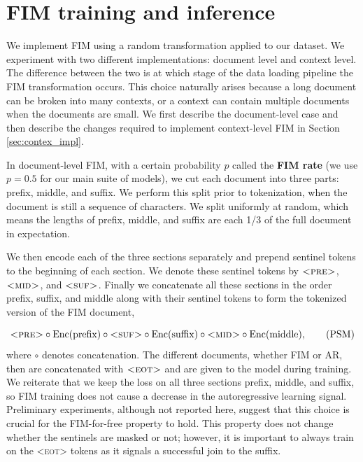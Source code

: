 \documentclass[postscript]{article}
\begin{document}
\section{FIM training and inference}
\label{sec:fim_training}

We implement FIM using a random transformation applied to our dataset. We experiment with two different implementations: document level and context level.
The difference between the two is at which stage of the data loading pipeline the FIM transformation occurs.
This choice naturally arises because a long document can be broken into many contexts, or a context can contain multiple documents when the documents are small.
We first describe the document-level case and then describe the changes required to implement context-level FIM in Section \ref{sec:contex_impl}. 

In document-level FIM, with a certain probability $p$ called the \textbf{FIM rate} (we use $p=0.5$ for our main suite of models), we cut each document into three parts: prefix, middle, and suffix. We perform this split prior to tokenization, when the document is still a sequence of characters. We split uniformly at random, which means the lengths of prefix, middle, and suffix are each 1/3 of the full document in expectation.

We then encode each of the three sections separately and prepend sentinel tokens to the beginning of each section. We denote these sentinel tokens by $\textsc{<pre>}$, $\textsc{<mid>}$, and $\textsc{<suf>}$. Finally we concatenate all these sections in the order prefix, suffix, and middle along with their sentinel tokens to form the tokenized version of the FIM document,

\[
  \textsc{<pre>} \circ \text{Enc}(\text{prefix}) \circ \textsc{<suf>}\circ \text{Enc}(\text{suffix}) \circ \textsc{<mid>}\circ \text{Enc}(\text{middle}),   \tag{PSM}
\]
where $\circ$ denotes concatenation. The different documents, whether FIM or AR, then are concatenated with $\textsc{<eot>}$ and are given to the model during training. 
We reiterate
that we keep the loss on all three sections prefix, middle, and suffix, so FIM training does not cause a decrease in the autoregressive learning signal. Preliminary experiments, although not reported here, suggest that this choice is crucial for the FIM-for-free property to hold. This property does not change whether the sentinels are masked or not; however, it is important to always train on the \textsc{<eot>} tokens as it signals a successful join to the suffix.
\end{document}
